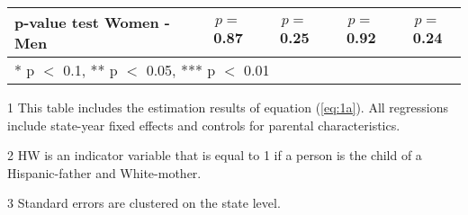 \begin{table}[H]
\begin{threeparttable}
\begin{tabular}[t]{lcccc}
p-value test Women - Men & $p=$0.87 & $p=$0.25 & $p=$0.92 & $p=$0.24\\
\bottomrule
\multicolumn{5}{l}{\rule{0pt}{1em}* p $<$ 0.1, ** p $<$ 0.05, *** p $<$ 0.01}\\
\end{tabular}
\begin{tablenotes}
\item[1] {\footnotesize{This table includes the estimation results of equation (\ref{eq:1a}). All regressions include state-year fixed effects and controls for parental characteristics.}}
\item[2] {\footnotesize{HW is an indicator variable that is equal to 1 if a person is the child of a Hispanic-father and White-mother.}}
\item[3] {\footnotesize{Standard errors are clustered on the state level.}}
\end{tablenotes}
\end{threeparttable}
\end{table}
